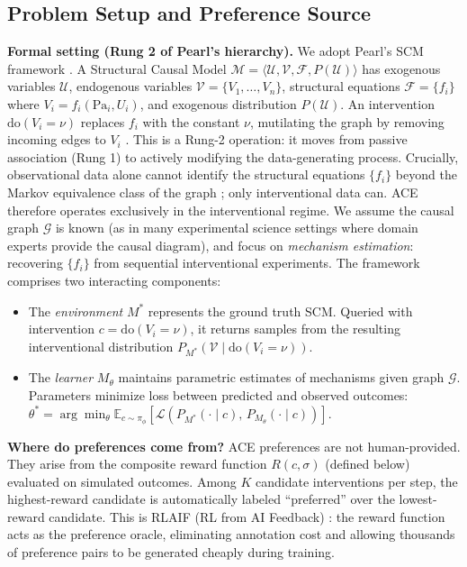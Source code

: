 \documentclass{article}
\theoremstyle{plain}
\theoremstyle{definition}
\theoremstyle{remark}
\begin{document}
\subsection{Problem Setup and Preference Source}
\label{sec:problem}

\textbf{Formal setting (Rung 2 of Pearl's hierarchy).} We adopt Pearl's SCM framework \citep{pearl2009causality,pearl1995causal}. A Structural Causal Model $\mathcal{M} = \langle \mathcal{U}, \mathcal{V}, \mathcal{F}, P(\mathcal{U}) \rangle$ has exogenous variables $\mathcal{U}$, endogenous variables $\mathcal{V} = \{V_1, \ldots, V_n\}$, structural equations $\mathcal{F} = \{f_i\}$ where $V_i = f_i(\text{Pa}_i, U_i)$, and exogenous distribution $P(\mathcal{U})$. An intervention $\text{do}(V_i = \nu)$ replaces $f_i$ with the constant $\nu$, mutilating the graph by removing incoming edges to $V_i$ \citep{pearl2009causality}. This is a Rung-2 operation: it moves from passive association (Rung 1) to actively modifying the data-generating process. Crucially, observational data alone cannot identify the structural equations $\{f_i\}$ beyond the Markov equivalence class of the graph \citep{spirtes2000causation,peters2017elements}; only interventional data can. ACE therefore operates exclusively in the interventional regime. We assume the causal graph $\mathcal{G}$ is known (as in many experimental science settings where domain experts provide the causal diagram), and focus on \emph{mechanism estimation}: recovering $\{f_i\}$ from sequential interventional experiments. The framework comprises two interacting components:

\begin{itemize}[leftmargin=1.2em,topsep=0.2em,itemsep=0.1em]
\item The \emph{environment} $M^*$ represents the ground truth SCM. Queried with intervention $c = \text{do}(V_i = \nu)$, it returns samples from the resulting interventional distribution $P_{M^*}(\mathcal{V} \mid \text{do}(V_i = \nu))$.
\item The \emph{learner} $M_\theta$ maintains parametric estimates of mechanisms given graph $\mathcal{G}$. Parameters minimize loss between predicted and observed outcomes: $\theta^* = \arg\min_\theta \mathbb{E}_{c \sim \pi_\phi}[\mathcal{L}(P_{M^*}(\cdot\mid c),\, P_{M_\theta}(\cdot\mid c))]$.
\end{itemize}

\textbf{Where do preferences come from?} ACE preferences are not human-provided. They arise from the composite reward function $R(c, \sigma)$ (defined below) evaluated on simulated outcomes. Among $K$ candidate interventions per step, the highest-reward candidate is automatically labeled ``preferred'' over the lowest-reward candidate. This is RLAIF (RL from AI Feedback) \citep{rafailov2023direct}: the reward function acts as the preference oracle, eliminating annotation cost and allowing thousands of preference pairs to be generated cheaply during training.
\end{document}
